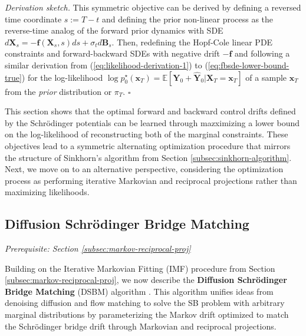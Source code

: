 \documentclass{article}
\newcommand{\boldtext}[1]{\textbf{\textcolor{MyGreen}{#1}}}
\begin{document}
\textit{Derivation sketch.} This symmetric objective can be derived by defining a reversed time coordinate $s:=T-t$ and defining the prior non-linear process as the reverse-time analog of the forward prior dynamics with SDE $d\boldsymbol{X}_s=-\boldsymbol{f}(\boldsymbol{X}_s,s)ds+\sigma_t d\boldsymbol{B}_s$. Then, redefining the Hopf-Cole linear PDE constraints and forward-backward SDEs with negative drift $-\boldsymbol{f}$ and following a similar derivation from (\ref{eq:likelihood-derivation-1}) to (\ref{eq:fbsde-lower-bound-true}) for the log-likelihood $\log p^\star_0(\boldsymbol{x}_T)=\mathbb{E}[\boldsymbol{Y}_0+\widehat{\boldsymbol{Y}}_0|\boldsymbol{X}_T=\boldsymbol{x}_T]$ of a sample $\boldsymbol{x}_T$ from the \textit{prior} distribution or $\pi_T$. \hfill $\square$

This section shows that the optimal forward and backward control drifts defined by the Schrödinger potentials can be learned through mazximizing a lower bound on the log-likelihood of reconstructing both of the marginal constraints. These objectives lead to a symmetric alternating optimization procedure that mirrors the structure of Sinkhorn's algorithm from Section \ref{subsec:sinkhorn-algorithm}. Next, we move on to an alternative perspective, considering the optimization process as performing iterative Markovian and reciprocal projections rather than maximizing likelihoods.

\subsection{Diffusion Schrödinger Bridge Matching}
\label{subsec:diffusionsbm}
\textit{Prerequisite: Section \ref{subsec:markov-reciprocal-proj}}

Building on the Iterative Markovian Fitting (IMF) procedure from Section \ref{subsec:markov-reciprocal-proj}, we now describe the \boldtext{Diffusion Schrödinger Bridge Matching} (DSBM) algorithm \citep{shi2023diffusion}. This algorithm unifies ideas from denoising diffusion \citep{song2020score, ho2020denoising} and flow matching \citep{lipman2022flow} to solve the SB problem with arbitrary marginal distributions by parameterizing the Markov drift optimized to match the Schrödinger bridge drift through Markovian and reciprocal projections. 
\end{document}
